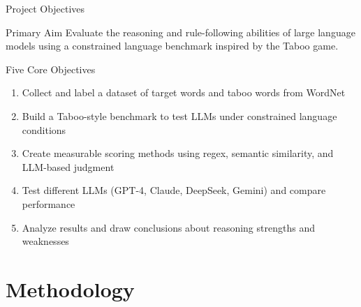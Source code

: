 \documentclass[aspectratio=169]{beamer}
\begin{document}
\begin{frame}{Project Objectives}
\begin{block}{Primary Aim}
Evaluate the reasoning and rule-following abilities of large language models using a constrained language benchmark inspired by the Taboo game.
\end{block}

\begin{block}{Five Core Objectives}
\begin{enumerate}
    \item Collect and label a dataset of target words and taboo words from WordNet
    \item Build a Taboo-style benchmark to test LLMs under constrained language conditions
    \item Create measurable scoring methods using regex, semantic similarity, and LLM-based judgment
    \item Test different LLMs (GPT-4, Claude, DeepSeek, Gemini) and compare performance
    \item Analyze results and draw conclusions about reasoning strengths and weaknesses
\end{enumerate}
\end{block}
\end{frame}

\section{Methodology}
\end{document}
